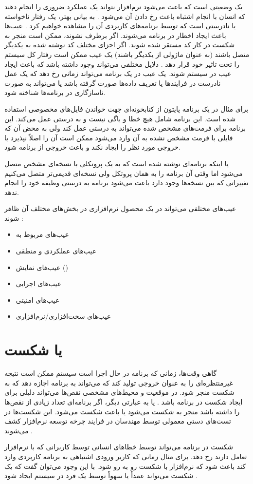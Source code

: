 \documentclass[10pt, a4paper]{article}
\begin{document}
یک وضعیتی است که باعث می‌شود نرم‌افزار نتواند یک عملکرد ضروری را انجام دهند که
انسان با انجام اشتباه باعث رخ دادن آن می‌شود \cite{jpoint}. به بیانی بهتر،
 یک رفتار ناخواسته یا نادرستی است که توسط برنامه‌های کاربردی آن را
مشاهده خواهیم کرد \cite{geekflare}. عیب‌ها باعث ایجاد اخطار در برنامه می‌شوند.
اگر برطرف نشوند، ممکن است منجر به شکست در کار کد مستقر شده شوند. اگر اجزای مختلف
کد نوشته شده به یکدیگر متصل باشند (به عنوان ماژولی از یکدیگر باشند) یک عیب ممکن
است رفتار کل سیستم را تحت تاثیر خود قرار دهد \cite{geekflare}. دلایل مختلفی
می‌تواند وجود داشته باشد که باعث ایجاد عیب در سیستم شوند. یک عیب در یک برنامه
می‌تواند زمانی رخ دهد که یک عمل نادرست در فرایند‌ها یا تعریف داده‌ها صورت گرفته
باشد یا می‌تواند به صورت ناسازگاری در برنامه‌ها شناخته شود.

برای مثال در یک برنامه پایتون از کتابخونه‌ای جهت خواندن فایل‌های مخصوصی استفاده
شده است. این برنامه شامل هیچ خطا و باگی نیست و به درستی عمل می‌کند. این برنامه
برای فرمت‌های مشخص شده می‌تواند به درستی عمل کند ولی به محض آن که فایلی با فرمت
مشخص نشده به آن وارد می‌شود ممکن است آن را اصلاً نپذیرد یا خروجی مورد نظر را
ایجاد نکند و باعث خروجی از برنامه شود.

یا اینکه برنامه‌ای نوشته شده است که به یک پروتکلی با نسخه‌ای مشخص متصل می‌شود
اما وقتی آن برنامه را به همان پروتکل ولی نسخه‌ای قدیمی‌تر متصل می‌کنیم تغییراتی
که بین نسخه‌ها وجود دارد باعث می‌شود برنامه به درستی وظیفه خود را انجام ندهد.

عیب‌های مختلفی می‌تواند در یک محصول نرم‌افزاری در بخش‌های مختلف آن ظاهر شوند
\cite{jpoint}:

\begin{itemize}
    \item عیب‌های مربوط به 
    \item عیب‌های عملکردی و منطقی
    \item عیب‌های نمایش ()
    \item عیب‌های اجرایی
    \item عیب‌های امنیتی
    \item عیب‌های سخت‌افزاری/نرم‌افزاری
\end{itemize}

\section{ یا شکست}

گاهی وقت‌ها، زمانی که برنامه در حال اجرا است سیستم ممکن است نتیجه‌ غیرمنتظره‌ای
را به عنوان خروجی تولید کند که می‌تواند به برنامه اجازه دهد که به شکست منجر شود.
در موقعیت و محیط‌های مشخصی نقص‌ها می‌تواند دلیلی برای ایجاد شکست در برنامه باشد
\cite{geekflare}. یا به عبارتی دیگر، اگر برنامه‌ای تعداد زیادی از نقص‌ها را
داشته باشد منجر به شکست می‌شود یا باعث شکست می‌شود. این شکست‌ها در تست‌های دستی
معمولی توسط مهندسان در فرایند چرخه توسعه نرم‌افزار کشف می‌شوند \cite{jpoint}.

شکست در برنامه می‌تواند توسط خطا‌های انسانی توسط کاربرانی که با نرم‌افزار تعامل
دارند رخ دهد. برای مثال زمانی که کاربر ورودی اشتباهی به برنامه کاربردی وارد کند
باعث شود که نرم‌افزار با شکست رو به رو شود. با این وجود می‌توان گفت که یک شکست
می‌تواند عمداً یا سهواً توسط یک فرد در سیستم ایجاد شود \cite{geekflare}.




\end{document}
